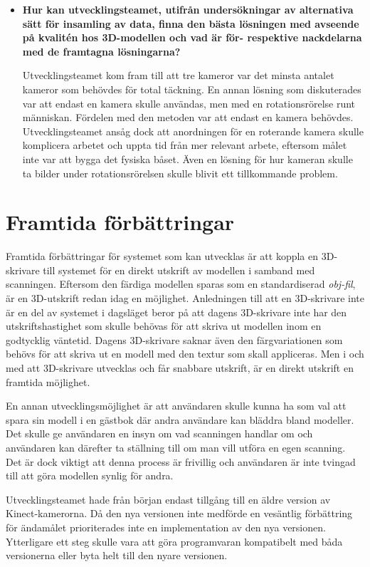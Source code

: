 \documentclass[a4paper,12pt,oneside,final]{extbook}
\begin{document}
\begin{itemize}
\item \textbf{Hur kan utvecklingsteamet, utifrån undersökningar av alternativa sätt för insamling av data, finna den bästa lösningen med avseende på kvalitén hos 3D-modellen och vad är för- respektive nackdelarna med de framtagna lösningarna?}

Utvecklingsteamet kom fram till att tre kameror var det minsta antalet kameror som behövdes för total täckning. En annan lösning som diskuterades var att endast en kamera skulle användas, men med en rotationsrörelse runt människan. Fördelen med den metoden var att endast en kamera behövdes. Utvecklingsteamet ansåg dock att anordningen för en roterande kamera skulle komplicera arbetet och uppta tid från mer relevant arbete, eftersom målet inte var att bygga det fysiska båset. Även en lösning för hur kameran skulle ta bilder under rotationsrörelsen skulle blivit ett tillkommande problem.
\end{itemize}





\section{Framtida förbättringar}
Framtida förbättringar för systemet som kan utvecklas är att koppla en 3D-skrivare till systemet för en direkt utskrift av modellen i samband med scanningen. Eftersom den färdiga modellen sparas som en standardiserad \emph{obj-fil}, är en 3D-utskrift redan idag en möjlighet. Anledningen till att en 3D-skrivare inte är en del av systemet i dagsläget beror på att dagens 3D-skrivare inte har den utskriftshastighet som skulle behövas för att skriva ut modellen inom en godtycklig väntetid. Dagens 3D-skrivare saknar även den färgvariationen som behövs för att skriva ut en modell med den textur som skall appliceras. Men i och med att 3D-skrivare utvecklas och får snabbare utskrift, är en direkt utskrift en framtida möjlighet.

En annan utvecklingsmöjlighet är att användaren skulle kunna ha som val att spara sin modell i en gästbok där andra användare kan bläddra bland modeller. Det skulle ge användaren en insyn om vad scanningen handlar om och användaren kan därefter ta ställning till om man vill utföra en egen scanning. Det är dock viktigt att denna process är frivillig och användaren är inte tvingad till att göra modellen synlig för andra.

Utvecklingsteamet hade från början endast tillgång till en äldre version av Kinect-kamerorna. Då den nya versionen inte medförde en vesäntlig förbättring för ändamålet prioriterades inte en implementation av den nya versionen. Ytterligare ett steg skulle vara att göra programvaran kompatibelt med båda versionerna eller byta helt till den nyare versionen.
\end{document}

